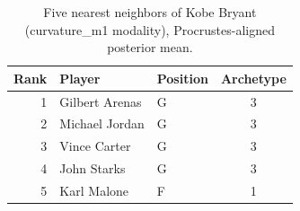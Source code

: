 \begin{table}[htbp]
  \centering\small
  \begin{tabular}{rllc}
    \toprule
    Rank & Player & Position & Archetype \\
    \midrule
    1 & Gilbert Arenas & G & 3 \\
    2 & Michael Jordan & G & 3 \\
    3 & Vince Carter & G & 3 \\
    4 & John Starks & G & 3 \\
    5 & Karl Malone & F & 1 \\
    \bottomrule
  \end{tabular}
  \caption{Five nearest neighbors of Kobe Bryant (curvature_m1 modality), Procrustes-aligned posterior mean.}
  \label{tab:Kobe_Bryant_neighbors_curvature_m1}
\end{table}

